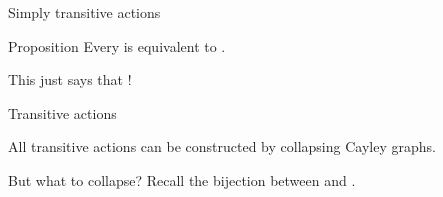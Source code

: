 \documentclass[8pt, handout]{beamer}
\newcommand{\Pause}{}      %
\begin{document}
\begin{frame}{Simply transitive actions}
  \begin{alertblock}{Proposition}
    Every  is equivalent to
    .
  \end{alertblock}
  
  \medskip\Pause 
  
  This just says that \emph{}!  
  
\end{frame}


\begin{frame}{Transitive actions}

  All transitive actions can be constructed by collapsing Cayley graphs.

  \medskip\Pause
  
  But what to collapse? Recall the bijection between
   and .
  

\end{frame}
\end{document}
